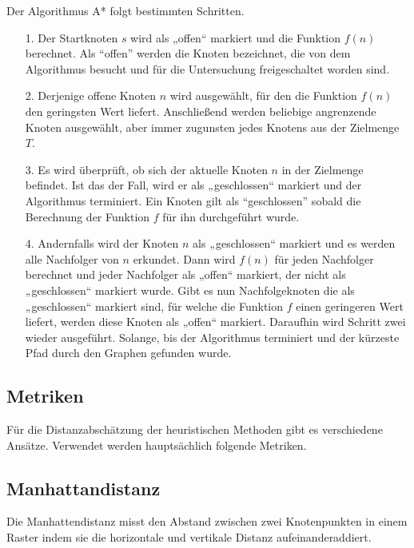 
Der Algorithmus A* folgt bestimmten Schritten. 
\begin{itemize}
\item[1.] Der Startknoten $s$ wird als „offen“ markiert und die Funktion $f(n)$ berechnet. Als “offen” werden die Knoten bezeichnet, die von dem Algorithmus besucht und für die Untersuchung freigeschaltet worden sind.
\item[2.] Derjenige offene Knoten $n$ wird ausgewählt, für den die Funktion $f(n)$ %
den geringsten Wert liefert. Anschließend werden beliebige angrenzende Knoten ausgewählt, aber immer zugunsten jedes Knotens aus der Zielmenge $T$.
\item[3.] Es wird überprüft, ob sich der aktuelle Knoten $n$ in der Zielmenge befindet. Ist das der Fall, wird er als „geschlossen“ markiert und der Algorithmus terminiert. Ein Knoten gilt als “geschlossen” sobald die Berechnung der Funktion $f$ für ihn durchgeführt wurde. %
\item[4.] %
Andernfalls wird der Knoten $n$ als „geschlossen“ markiert und es werden alle Nachfolger von $n$ erkundet. Dann wird $f(n)$ für jeden Nachfolger berechnet und jeder Nachfolger als „offen“ markiert, der nicht als „geschlossen“ markiert wurde. Gibt es nun Nachfolgeknoten die als „geschlossen“ markiert sind, für welche die Funktion $f$ einen geringeren Wert liefert, werden diese Knoten als „offen“ markiert. Daraufhin wird Schritt zwei wieder ausgeführt. Solange, bis der Algorithmus terminiert und der kürzeste Pfad durch den Graphen gefunden wurde\cite{HartNilssonandRaphael.1968}.
\end{itemize}
\subsection{Metriken}
Für die Distanzabschätzung der heuristischen Methoden gibt es verschiedene Ansätze. Verwendet werden hauptsächlich folgende Metriken.
\subsection{Manhattandistanz}
Die Manhattendistanz misst den Abstand zwischen zwei Knotenpunkten in einem Raster indem sie die horizontale und vertikale Distanz aufeinanderaddiert.

